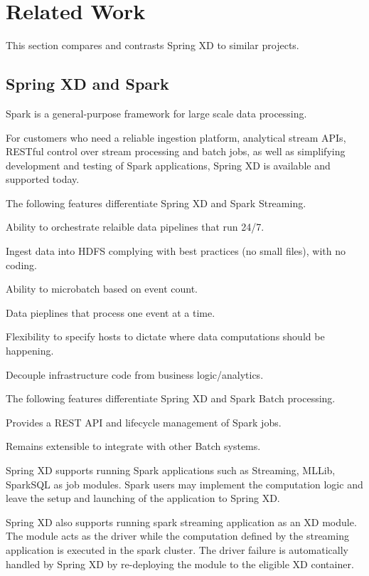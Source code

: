 \section{Related Work}
This section compares and contrasts Spring XD to similar projects.

\subsection{Spring XD and Spark}
Spark\cite{spark} is a general-purpose framework for large scale data processing.

For customers who need a reliable ingestion platform, analytical stream APIs, RESTful control over stream processing and batch jobs, as well as simplifying development and testing of Spark applications, Spring XD is available and supported today.

The following features differentiate Spring XD and Spark Streaming.

\begin{itemize*}
\item Ability to orchestrate relaible data pipelines that run 24/7.
\item Ingest data into HDFS complying with best practices (no small files), with no coding.
\item Ability to microbatch based on event count.
\item Data pieplines that process one event at a time.
\item Flexibility to specify hosts to dictate where data computations should be happening.
\item Decouple infrastructure code from business logic\slash analytics.
\end{itemize*}

The following features differentiate Spring XD and Spark Batch processing.

\begin{itemize*}
\item Provides a REST API and lifecycle management of Spark jobs.
\item Remains extensible to integrate with other Batch systems.
\end{itemize*}

Spring XD supports running Spark applications such as Streaming, MLLib, SparkSQL as job modules.
Spark users may implement the computation logic and leave the setup and launching of the
application to Spring XD.

Spring XD also supports running spark streaming application as an XD
module. The module acts as the driver while the computation defined by the streaming application
is executed in the spark cluster. The driver failure is automatically handled by Spring XD
by re-deploying the module to the eligible XD container.

